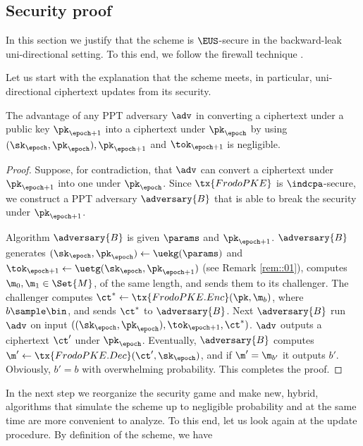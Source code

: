 \documentclass{fundam}
\begin{document}
\subsection{Security proof}
In this section we justify that the scheme is $\EUS$-secure in the backward-leak uni-directional setting. To this end, we follow the firewall technique \cite{jiang2020,nishimaki2022direction}.

Let us start with the explanation that the scheme meets, in particular, uni-directional ciphertext updates from its security.
\begin{theorem}
	The advantage of any PPT adversary $\adv$ in converting a ciphertext under a public key $\pk_{\epoch+1}$ into a ciphertext under $\pk_{\epoch}$ by using $(\sk_{\epoch},\pk_{\epoch}), \pk_{\epoch+1}$ and $\tok_{\epoch+1}$ is negligible.
\end{theorem}	

\begin{proof}
Suppose, for contradiction, that $\adv$ can convert a ciphertext under $\pk_{\epoch+1}$ into one under $\pk_{\epoch}$. Since $\tx{FrodoPKE}$ is $\indcpa$-secure, we construct a PPT adversary $\adversary{B}$ that is able to break the security under $\pk_{\epoch+1}$.  

Algorithm $\adversary{B}$ is given $\params$ and $\pk_{\epoch+1}$. $\adversary{B}$ generates $(\sk_{\epoch}, \pk_{\epoch})\gets \uekg(\params)$ and $\tok_{\epoch+1}\gets\uetg(\sk_{\epoch},\pk_{\epoch+1})$ (see Remark \ref{rem::01}), 
computes $\m_{0}, \m_{1}\in\Set{M}$, of the same length, and sends them to its challenger. The challenger computes $\ct^{*}\gets \tx{FrodoPKE.Enc}(\pk, \m_{b})$, where $b\sample\bin$, and sends $\ct^{*}$ to $\adversary{B}$. Next $\adversary{B}$ run $\adv$ on input $((\sk_{\epoch},\pk_{\epoch}),\tok_{\epoch+1}, \ct^{*})$. $\adv$ outputs a ciphertext $\ct'$ under $\pk_{\epoch}$. Eventually, $\adversary{B}$ computes $\m'\gets \tx{FrodoPKE.Dec}(\ct', \sk_{\epoch})$, and if $\m' = \m_{b'}$ it outputs $b'$. Obviously, $b'=b$ with overwhelming probability. This completes the proof.

\end{proof}	

In the next step we reorganize the security game and make new, hybrid, algorithms that simulate the scheme up to negligible probability and at the same time are more convenient to analyze. To this end, let us look again at the update procedure. By definition of the scheme, we have 
\end{document}
